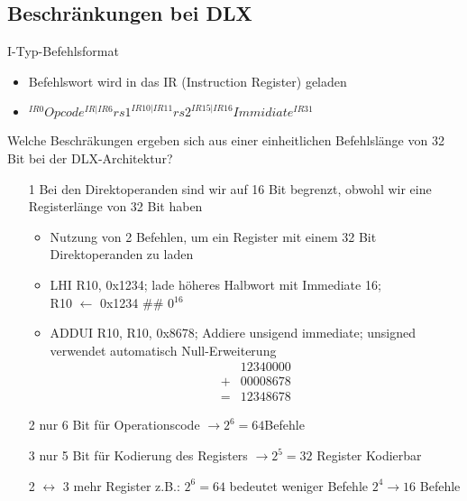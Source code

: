 \subsection{Beschränkungen bei DLX}
I-Typ-Befehlsformat
	\begin{itemize}
		\item Befehlswort wird in das IR (Instruction Register) geladen
		\item $ ^{IR0}Opcode^{IR|IR6}rs1^{IR10|IR11}rs2^{IR15|IR16}Immidiate^{IR31}$
	\end{itemize}
Welche Beschräkungen ergeben sich aus einer einheitlichen Befehlslänge von 32 Bit bei der DLX-Architektur?
\begin{itemize}
	\item[1] Bei den Direktoperanden sind wir auf 16 Bit begrenzt, obwohl wir eine Registerlänge von 32 Bit haben
	\begin{itemize}
		\item Nutzung von 2 Befehlen, um ein Register mit einem 32 Bit Direktoperanden zu laden
		\item LHI R10, 0x1234; lade höheres Halbwort mit Immediate 16; \\R10 $\leftarrow$ 0x1234 \#\# 0$^{16}$
		\item ADDUI R10, R10, 0x8678; Addiere unsigend immediate; unsigned verwendet automatisch Null-Erweiterung
		\begin{align*}
			&12340000\\
			+&00008678\\
			=&12348678
		\end{align*}
	\end{itemize}
	\item[2] nur 6 Bit für Operationscode $\to 2^6 = 64 $Befehle
	\item[3] nur 5 Bit für Kodierung des Registers $\to 2^5 = 32$ Register Kodierbar
	\item[2 $\leftrightarrow$ 3] mehr Register z.B.: $2^6 = 64$ bedeutet weniger Befehle $2^4 \to 16$ Befehle
\end{itemize}
